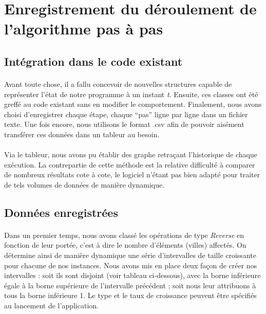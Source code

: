 \documentclass[a4paper,10pt]{report}
\begin{document}
\section{Enregistrement du déroulement de l'algorithme pas à pas}
\subsection{Intégration dans le code existant}

\paragraph{}
  Avant toute chose, il a fallu concevoir de nouvelles structures capable de
représenter l'état de notre programme à un instant \textit{t}. Ensuite, ces
classes ont été greffé au code existant sans en modifier le comportement.
Finalement, nous avons choisi d'enregistrer chaque étape, chaque ``pas'' ligne
par ligne dans un fichier texte. Une fois encore, nous utilisons le format .csv
afin de pouvoir aisément transférer ces données dans un tableur au besoin.

\paragraph{}
  Via le tableur, nous avons pu établir des graphe retraçant l'historique de
chaque exécution. La contrepartie de cette méthode est la relative difficulté à
comparer de nombreux résultats cote à cote, le logiciel n'étant pas bien adapté
pour traiter de tels volumes de données de manière dynamique.

\subsection{Données enregistrées}

\paragraph{}
  Dans un premier temps, nous avons classé les opérations de type
\textit{Reverse} en fonction de leur portée, c'est à dire le nombre d'éléments
(villes) affectés. On détermine ainsi de manière dynamique une série
d'intervalles de taille croissante pour chacune de nos instances. Nous avons mis
en place deux façon de créer nos intervalles : soit ils sont disjoint (voir
tableau ci-dessous), avec la borne inférieure égale à la borne supérieure de
l'intervalle précédent ; soit nous leur attribuons à tous la borne inférieure 1.
Le type et le taux de croissance peuvent être spécifiés au lancement de
l'application.
\end{document}
